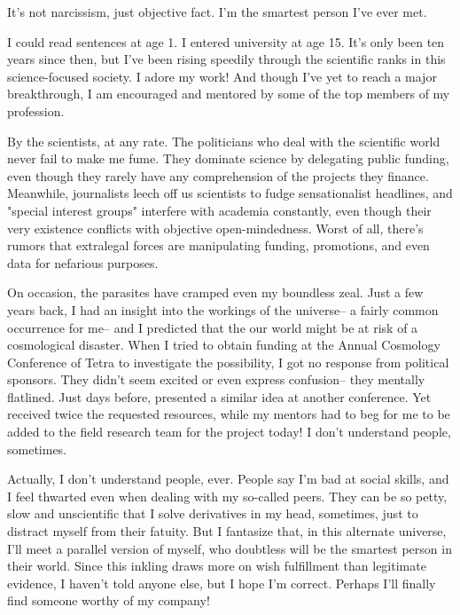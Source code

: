 \documentclass[char]{guildcamp3}
\begin{document}
\name{\cSciTwo{}}


It's not narcissism, just objective fact. I'm the smartest person I've ever met.

I could read sentences at age 1. I entered university at age 15. It's only been ten years since then, but I've been rising speedily through the scientific ranks in this science-focused society. I adore my work! And though I've yet to reach a major breakthrough, I am encouraged and mentored by some of the top members of my profession.

By the scientists, at any rate. The politicians who deal with the scientific world never fail to make me fume. They dominate science by delegating public funding, even though they rarely have any comprehension of the projects they finance. Meanwhile, journalists leech off us scientists to fudge sensationalist headlines, and "special interest groups" interfere with academia constantly, even though their very existence conflicts with objective open-mindedness. Worst of all, there's rumors that extralegal forces are manipulating funding, promotions, and even data for nefarious purposes.

On occasion, the parasites have cramped even my boundless zeal. Just a few years back, I had an insight into the workings of the universe-- a fairly common occurrence for me-- and I predicted that the our world might be at risk of a cosmological disaster. When I tried to obtain funding at the Annual Cosmology Conference of Tetra to investigate the possibility, I got no response from political sponsors. They didn't seem excited or even express confusion-- they mentally flatlined. Just days before, \cSciOne{} presented a similar idea at another conference. Yet \cSciOne{\they} received twice the requested resources, while my mentors had to beg for me to be added to the field research team for the project today! I don't understand people, sometimes.

Actually, I don't understand people, ever. People say I'm bad at social skills, and I feel thwarted even when dealing with my so-called peers. They can be so petty, slow and unscientific that I solve derivatives in my head, sometimes, just to distract myself from their fatuity. But I fantasize that, in this alternate universe, I'll meet a parallel version of myself, who doubtless will be the smartest person in their world. Since this inkling draws more on wish fulfillment than legitimate evidence, I haven't told anyone else, but I hope I'm correct. Perhaps I'll finally find someone worthy of my company!
\end{document}
